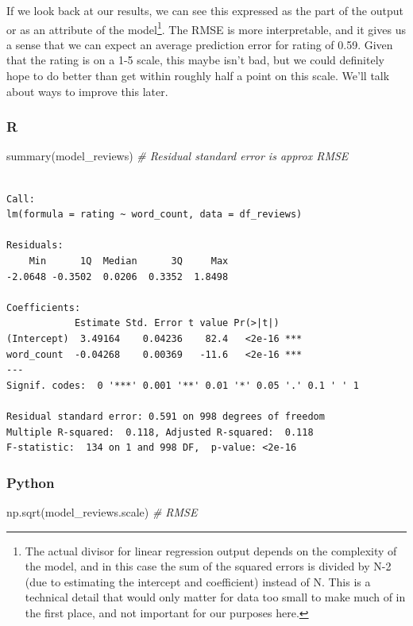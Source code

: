 \documentclass[
  letterpaper,
]{krantz}
\newenvironment{Shaded}{}{}
\newcommand{\CommentTok}[1]{\textcolor[rgb]{0.38,0.63,0.69}{\textit{#1}}}
\newcommand{\FunctionTok}[1]{\textcolor[rgb]{0.02,0.16,0.49}{#1}}
\newcommand{\NormalTok}[1]{#1}
\begin{document}
If we look back at our results, we can see this expressed as the part of
the output or as an attribute of the model\footnote{The actual divisor
  for linear regression output depends on the complexity of the model,
  and in this case the sum of the squared errors is divided by N-2 (due
  to estimating the intercept and coefficient) instead of N. This is a
  technical detail that would only matter for data too small to make
  much of in the first place, and not important for our purposes here.}.
The RMSE is more interpretable, and it gives us a sense that we can
expect an average prediction error for rating of 0.59. Given that the
rating is on a 1-5 scale, this maybe isn't bad, but we could definitely
hope to do better than get within roughly half a point on this scale.
We'll talk about ways to improve this later.

\subsubsection{R}

\begin{Shaded}
\begin{Highlighting}[]
\FunctionTok{summary}\NormalTok{(model\_reviews) }\CommentTok{\# \textquotesingle{}Residual standard error\textquotesingle{} is approx RMSE}
\end{Highlighting}
\end{Shaded}

\begin{verbatim}

Call:
lm(formula = rating ~ word_count, data = df_reviews)

Residuals:
    Min      1Q  Median      3Q     Max 
-2.0648 -0.3502  0.0206  0.3352  1.8498 

Coefficients:
            Estimate Std. Error t value Pr(>|t|)    
(Intercept)  3.49164    0.04236    82.4   <2e-16 ***
word_count  -0.04268    0.00369   -11.6   <2e-16 ***
---
Signif. codes:  0 '***' 0.001 '**' 0.01 '*' 0.05 '.' 0.1 ' ' 1

Residual standard error: 0.591 on 998 degrees of freedom
Multiple R-squared:  0.118, Adjusted R-squared:  0.118 
F-statistic:  134 on 1 and 998 DF,  p-value: <2e-16
\end{verbatim}

\subsubsection{Python}

\begin{Shaded}
\begin{Highlighting}[]
\NormalTok{np.sqrt(model\_reviews.scale)   }\CommentTok{\# RMSE}
\end{Highlighting}
\end{Shaded}
\end{document}
